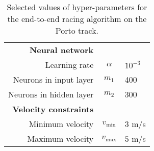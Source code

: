 \begin{table}[htb!]
\begin{tabularx}{0.75\textwidth}{RCL}
    \textbf{Neural network}                 &                           & \\
    Learning rate                           & $\alpha$                  & $10^{-3}$ \\
    Neurons in input layer                  & $m_1$                     & 400 \\
    Neurons in hidden layer                 & $m_2$                     & 300 \\
    \textbf{Velocity constraints}           &                           & \\
    Minimum velocity                        & $v_{\text{min}}$          & $3$ m/s \\
    Maximum velocity                        & $v_{\text{max}}$          & $5$ m/s \\
    \hline
\end{tabularx}
\caption[Selected values of hyper-parameters for the end-to-end algorithm]{Selected values of hyper-parameters for the end-to-end racing algorithm on the Porto track.}
\label{tab:inital_values}
\end{table}
